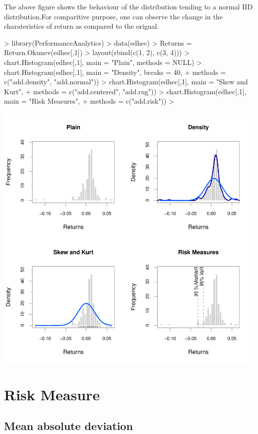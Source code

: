 \documentclass[12pt,letterpaper,english]{article}
\begin{document}
The above figure shows the behaviour of the distribution tending to a normal IID distribution.For comparitive purpose, one can observe the change in the charateristics of return as compared to the orignal.
\begin{Schunk}
\begin{Sinput}
> library(PerformanceAnalytics)
> data(edhec)
> Returns = Return.Okunev(edhec[,1])
> layout(rbind(c(1, 2), c(3, 4)))
>  chart.Histogram(edhec[,1], main = "Plain", methods = NULL)
>  chart.Histogram(edhec[,1], main = "Density", breaks = 40,
+  methods = c("add.density", "add.normal"))
>  chart.Histogram(edhec[,1], main = "Skew and Kurt",
+  methods = c("add.centered", "add.rug"))
> chart.Histogram(edhec[,1], main = "Risk Measures",
+  methods = c("add.risk"))
> 
\end{Sinput}
\end{Schunk}
\includegraphics{OWReturn-008}

\section{Risk Measure}

\subsection{Mean absolute deviation}
\end{document}

